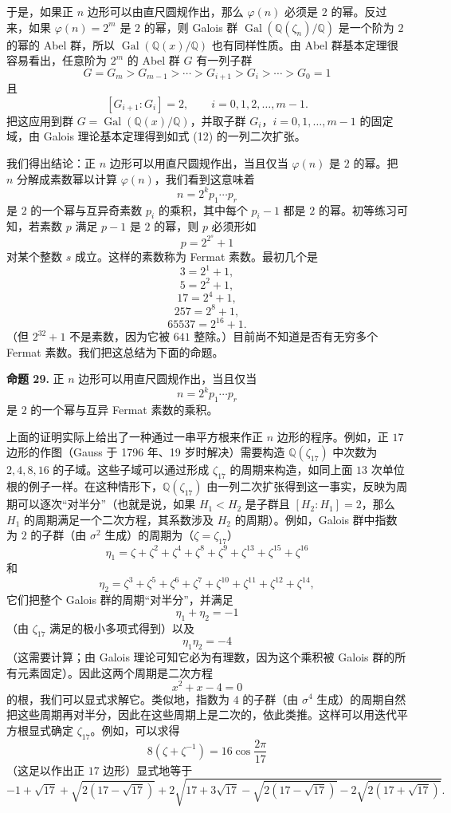 于是，如果正 $n$ 边形可以由直尺圆规作出，那么 $\varphi(n)$ 必须是 $2$ 的幂。反过来，如果 $\varphi(n)=2^m$ 是 $2$ 的幂，则 Galois 群 $\operatorname{Gal}(\mathbb Q(\zeta_n)/\mathbb Q)$ 是一个阶为 $2$ 的幂的 Abel 群，所以 $\operatorname{Gal}(\mathbb Q(x)/\mathbb Q)$ 也有同样性质。由 Abel 群基本定理很容易看出，任意阶为 $2^m$ 的 Abel 群 $G$ 有一列子群
\[
G=G_m>G_{m-1}>\cdots>G_{i+1}>G_i>\cdots>G_0=1
\]
且
\[
[G_{i+1}:G_i]=2,
\qquad i=0,1,2,\ldots,m-1.
\]
把这应用到群 $G=\operatorname{Gal}(\mathbb Q(x)/\mathbb Q)$，并取子群 $G_i$，$i=0,1,\ldots,m-1$ 的固定域，由 Galois 理论基本定理得到如式 (12) 的一列二次扩张。

我们得出结论：正 $n$ 边形可以用直尺圆规作出，当且仅当 $\varphi(n)$ 是 $2$ 的幂。把 $n$ 分解成素数幂以计算 $\varphi(n)$，我们看到这意味着
\[
n=2^k p_1\cdots p_r
\]
是 $2$ 的一个幂与互异奇素数 $p_i$ 的乘积，其中每个 $p_i-1$ 都是 $2$ 的幂。初等练习可知，若素数 $p$ 满足 $p-1$ 是 $2$ 的幂，则 $p$ 必须形如
\[
p=2^{2^s}+1
\]
对某个整数 $s$ 成立。这样的素数称为 Fermat 素数。最初几个是
\[
3=2^1+1,
\]
\[
5=2^2+1,
\]
\[
17=2^4+1,
\]
\[
257=2^8+1,
\]
\[
65537=2^{16}+1.
\]
（但 $2^{32}+1$ 不是素数，因为它被 $641$ 整除。）目前尚不知道是否有无穷多个 Fermat 素数。我们把这总结为下面的命题。

\noindent\textbf{命题 29.} 正 $n$ 边形可以用直尺圆规作出，当且仅当
\[
n=2^k p_1\cdots p_r
\]
是 $2$ 的一个幂与互异 Fermat 素数的乘积。

上面的证明实际上给出了一种通过一串平方根来作正 $n$ 边形的程序。例如，正 $17$ 边形的作图（Gauss 于 1796 年、19 岁时解决）需要构造 $\mathbb Q(\zeta_{17})$ 中次数为 $2,4,8,16$ 的子域。这些子域可以通过形成 $\zeta_{17}$ 的周期来构造，如同上面 $13$ 次单位根的例子一样。在这种情形下，$\mathbb Q(\zeta_{17})$ 由一列二次扩张得到这一事实，反映为周期可以逐次“对半分”（也就是说，如果 $H_1<H_2$ 是子群且 $[H_2:H_1]=2$，那么 $H_1$ 的周期满足一个二次方程，其系数涉及 $H_2$ 的周期）。例如，Galois 群中指数为 $2$ 的子群（由 $\sigma^2$ 生成）的周期为（$\zeta=\zeta_{17}$）
\[
\eta_1=\zeta+\zeta^2+\zeta^4+\zeta^8+\zeta^9+\zeta^{13}+\zeta^{15}+\zeta^{16}
\]
和
\[
\eta_2=\zeta^3+\zeta^5+\zeta^6+\zeta^7+\zeta^{10}+\zeta^{11}+\zeta^{12}+\zeta^{14},
\]
它们把整个 Galois 群的周期“对半分”，并满足
\[
\eta_1+\eta_2=-1
\]
（由 $\zeta_{17}$ 满足的极小多项式得到）以及
\[
\eta_1\eta_2=-4
\]
（这需要计算；由 Galois 理论可知它必为有理数，因为这个乘积被 Galois 群的所有元素固定）。因此这两个周期是二次方程
\[
x^2+x-4=0
\]
的根，我们可以显式求解它。类似地，指数为 $4$ 的子群（由 $\sigma^4$ 生成）的周期自然把这些周期再对半分，因此在这些周期上是二次的，依此类推。这样可以用迭代平方根显式确定 $\zeta_{17}$。例如，可以求得
\[
8(\zeta+\zeta^{-1})=16\cos\frac{2\pi}{17}
\]
（这足以作出正 $17$ 边形）显式地等于
\[
-1+\sqrt{17}+\sqrt{2(17-\sqrt{17})}
+2\sqrt{17+3\sqrt{17}-\sqrt{2(17-\sqrt{17})}-2\sqrt{2(17+\sqrt{17})}}.
\]

